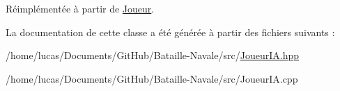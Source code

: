 Réimplémentée à partir de \hyperlink{class_joueur_aa97f71a90328693e0047ba2f48d61b4b}{Joueur}.



La documentation de cette classe a été générée à partir des fichiers suivants \+:\begin{DoxyCompactItemize}
\item 
/home/lucas/\+Documents/\+Git\+Hub/\+Bataille-\/\+Navale/src/\hyperlink{_joueur_i_a_8hpp}{Joueur\+I\+A.\+hpp}\item 
/home/lucas/\+Documents/\+Git\+Hub/\+Bataille-\/\+Navale/src/Joueur\+I\+A.\+cpp\end{DoxyCompactItemize}
